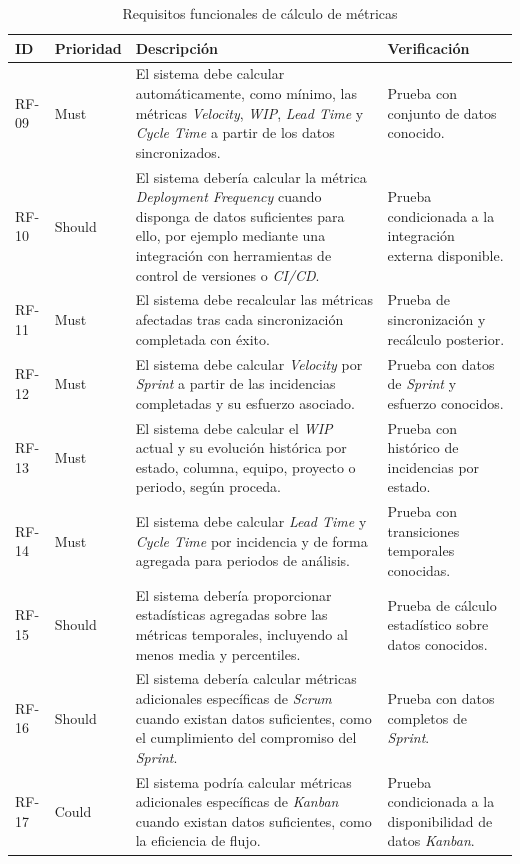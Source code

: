 {\renewcommand{\arraystretch}{1.28}\footnotesize
\begin{longtable}{p{1.35cm}p{1.65cm}p{6.9cm}p{2.9cm}}
\caption{Requisitos funcionales de cálculo de métricas}\label{tab:rf-calculo-metricas}\\
\toprule
\textbf{ID} & \textbf{Prioridad} & \textbf{Descripción} & \textbf{Verificación} \\
\midrule
RF-09 & Must & El sistema debe calcular automáticamente, como mínimo, las métricas \textit{Velocity}, \textit{WIP}, \textit{Lead Time} y \textit{Cycle Time} a partir de los datos sincronizados. & Prueba con conjunto de datos conocido. \\
RF-10 & Should & El sistema debería calcular la métrica \textit{Deployment Frequency} cuando disponga de datos suficientes para ello, por ejemplo mediante una integración con herramientas de control de versiones o \textit{CI/CD}. & Prueba condicionada a la integración externa disponible. \\
RF-11 & Must & El sistema debe recalcular las métricas afectadas tras cada sincronización completada con éxito. & Prueba de sincronización y recálculo posterior. \\
RF-12 & Must & El sistema debe calcular \textit{Velocity} por \textit{Sprint} a partir de las incidencias completadas y su esfuerzo asociado. & Prueba con datos de \textit{Sprint} y esfuerzo conocidos. \\
RF-13 & Must & El sistema debe calcular el \textit{WIP} actual y su evolución histórica por estado, columna, equipo, proyecto o periodo, según proceda. & Prueba con histórico de incidencias por estado. \\
RF-14 & Must & El sistema debe calcular \textit{Lead Time} y \textit{Cycle Time} por incidencia y de forma agregada para periodos de análisis. & Prueba con transiciones temporales conocidas. \\
RF-15 & Should & El sistema debería proporcionar estadísticas agregadas sobre las métricas temporales, incluyendo al menos media y percentiles. & Prueba de cálculo estadístico sobre datos conocidos. \\
RF-16 & Should & El sistema debería calcular métricas adicionales específicas de \textit{Scrum} cuando existan datos suficientes, como el cumplimiento del compromiso del \textit{Sprint}. & Prueba con datos completos de \textit{Sprint}. \\
RF-17 & Could & El sistema podría calcular métricas adicionales específicas de \textit{Kanban} cuando existan datos suficientes, como la eficiencia de flujo. & Prueba condicionada a la disponibilidad de datos \textit{Kanban}. \\
\bottomrule
\end{longtable}
\vspace{0.45em}
}

